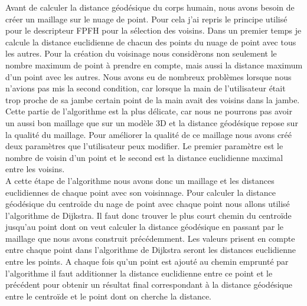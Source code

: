 Avant de calculer la distance géodésique du corps humain, nous avons besoin de créer un maillage sur le nuage de point. Pour cela
j'ai repris le principe utilisé pour le descripteur FPFH\cite{FPFH} pour la sélection des voisins. Dans un premier temps je calcule
la distance euclidienne de chacun des points du nuage de point avec tous les autres. Pour la création du voisinage nous considèrons non
seulement le nombre maximum de point à prendre en compte, mais aussi la distance maximum d'un point avec les autres. Nous avons eu
de nombreux problèmes lorsque nous n'avions pas mis la second condition, car lorsque la main de l'utilisateur était trop proche de sa 
jambe certain point de la main avait des voisins dans la jambe. Cette partie de l'algorithme est la plus délicate, car nous ne pourrons
pas avoir un aussi bon maillage que sur un modèle 3D et la distance géodésique repose sur la qualité du maillage. Pour améliorer la qualité
de ce maillage nous avons créé deux paramètres que l'utilisateur peux modifier. Le premier paramètre est le nombre de voisin d'un point et
le second est la distance euclidienne maximal entre les voisins.\\


A cette étape de l'algorithme nous avons donc un maillage et les distances euclidiennes de chaque point avec son voisinnage. Pour calculer
la distance géodésique du centroïde du nage de point avec chaque point nous allons utilisé l'algorithme de Dijkstra\cite{dijkstra}.
Il faut donc trouver le plus court chemin du centroïde jusqu'au point dont on veut calculer la distance géodésique en passant par le
maillage que nous avons construit précédemment. Les valeurs prisent en compte entre chaque point dans l'algorithme de Dijkstra seront
les distances euclidienne entre les points. A chaque fois qu'un point est ajouté au chemin emprunté par l'algorithme il faut 
additionner la distance euclidienne entre ce point et le précédent pour obtenir un résultat final correspondant à la distance 
géodésique entre le centroïde et le point dont on cherche la distance.\\

